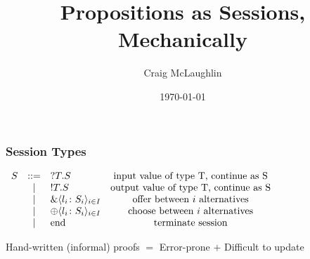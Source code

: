 \documentclass{beamer}
\title[Project Presentation]{Propositions as Sessions, Mechanically}
\author{Craig McLaughlin}
\institute{University Of Glasgow}
\date{\today}
\newcommand{\altt}{~|~}
\begin{document}
\begin{frame}
\titlepage
\end{frame}

\begin{comment}
today i am going to talk about a formalisation effort based on an existing
type system whose properties have previously only been studied
informally. first in order to motivate the previous and current work i shall
make two general observations here. one: distributed communication systems are
becoming increasingly prevalent in modern society. two: the correct
functioning of these systems hinges on the protocol between any two
communicating agents to be well-defined and correctly implemented.
\end{comment}

\begin{frame}
\frametitle{Session Types}
\begin{math}
  \begin{array}{rclc}
    S & \bnf  & \inpt{T}{S} & \mbox{input value of type T, continue as S}\\
      & \altt & \outpt{T}{S} & \mbox{output value of type T, continue as S}\\
      & \altt & \Branch{l_i}{S_i}{i\in I} &
                           \mbox{offer between $i$ alternatives}\\
      & \altt & \Choice{l_i}{S_i}{i\in I} &
                           \mbox{choose between $i$ alternatives}\\
      & \altt & \mbox{\lstinline{end}} & \mbox{terminate session}
 \end{array}
\end{math}
\end{frame}

\begin{comment}
one approach to achieve such correctness guarantees is by using binary session
types. [INTRODUCE BINARY SESSION TYPES HERE]. specifying a communication
protocol then involves providing mutual dual types to the communicating
parties. [a simple example with two processes is displayed].
\end{comment}

\begin{frame}
Hand-written (informal) proofs $=$ Error-prone $+$ Difficult to update
\end{frame}

\begin{comment}
there has been a lot of activity in this area producing a variety of different
session-based type systems. many systems build on top of previous work adding
more complex features such as asynchronous, polymorphic and recursive session
types. extending informal proofs is error-prone and difficult because it is
not always clear which parts of a system's metatheory is affected by a
change. a formalised system would reduce likelihood of errors in the proofs
and aid extension since the theorem prover would highlight changes to the
metatheory
\end{comment}
\end{document}
